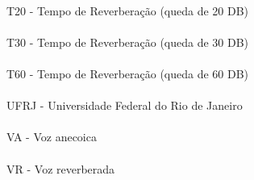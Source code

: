 \paragraph{}T20 - Tempo de Reverberação (queda de 20 DB)
\paragraph{}T30 - Tempo de Reverberação (queda de 30 DB)
\paragraph{}T60 - Tempo de Reverberação (queda de 60 DB)
\paragraph{}UFRJ - Universidade Federal do Rio de Janeiro 
\paragraph{}VA - Voz anecoica
\paragraph{}VR - Voz reverberada


\pagebreak







